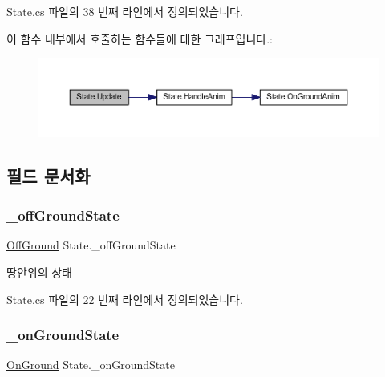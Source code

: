 State.\+cs 파일의 38 번째 라인에서 정의되었습니다.


\begin{DoxyCode}{0}

\end{DoxyCode}
이 함수 내부에서 호출하는 함수들에 대한 그래프입니다.\+:
\nopagebreak
\begin{figure}[H]
\begin{center}
\leavevmode
\includegraphics[width=350pt]{d0/d8b/class_state_ad3ecac701a93b8ef7e5365e0fc599243_cgraph}
\end{center}
\end{figure}


\subsection{필드 문서화}
\mbox{\label{class_state_ad421039bfc35b46969f174c9617ab786}} 
\subsubsection{\texorpdfstring{\_offGroundState}{\_offGroundState}}
{\footnotesize\ttfamily \mbox{\hyperlink{class_state_a7d945e793324c017a973205564cf1a56}{Off\+Ground}} State.\+\_\+off\+Ground\+State}



땅안위의 상태 



State.\+cs 파일의 22 번째 라인에서 정의되었습니다.

\mbox{\label{class_state_ab3170df5e58f541f39edff3c1278d443}} 
\subsubsection{\texorpdfstring{\_onGroundState}{\_onGroundState}}
{\footnotesize\ttfamily \mbox{\hyperlink{class_state_ab9eb1c1d81f1903b8486d1275e78b68e}{On\+Ground}} State.\+\_\+on\+Ground\+State}



